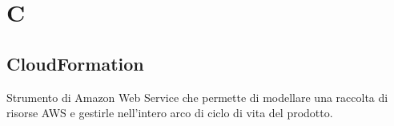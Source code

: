 \section*{C}
\markright{}
\subsection*{CloudFormation}
Strumento di Amazon Web Service che permette di modellare una raccolta di risorse AWS e gestirle nell'intero arco di ciclo di vita del prodotto.